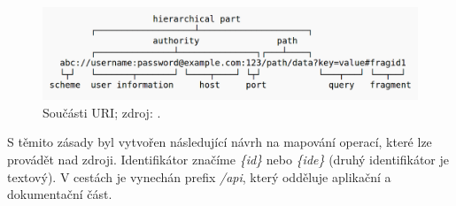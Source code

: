 \begin{figure}[ht!]
  \centering
  \includegraphics[width=130mm]{./images/uri.png}
  \caption{Součásti URI; zdroj: \cite{uri_wiki}.\label{overflow}}
  \label{fig:state_match}
\end{figure}

S těmito zásady byl vytvořen následující návrh na mapování operací, které lze provádět nad zdroji.
Identifikátor značíme \textit{\{id\}} nebo \textit{\{ide\}} (druhý identifikátor je textový).
V cestách je vynechán prefix \textit{/api}, který odděluje aplikační a dokumentační část.


